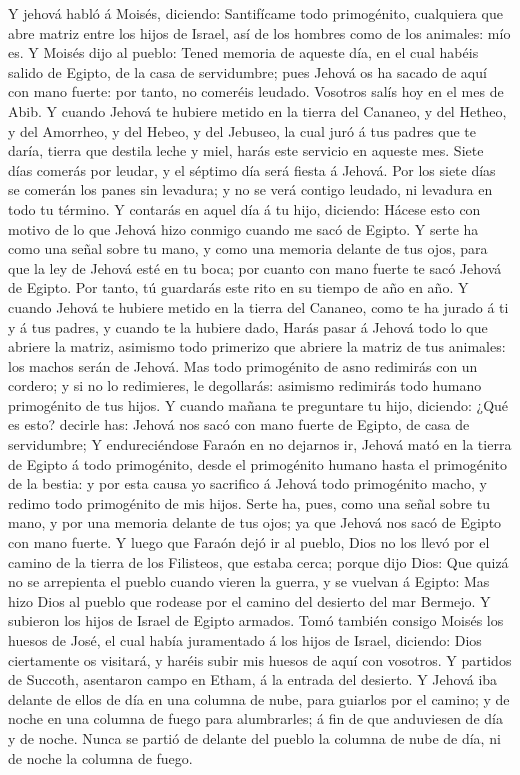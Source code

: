  Y jehová habló á Moisés, diciendo:  Santifícame
todo primogénito, cualquiera que abre matriz entre los hijos de Israel,
así de los hombres como de los animales: mío es.  Y Moisés
dijo al pueblo: Tened memoria de aqueste día, en el cual habéis salido
de Egipto, de la casa de servidumbre; pues Jehová os ha sacado de aquí
con mano fuerte: por tanto, no comeréis leudado.  Vosotros
salís hoy en el mes de Abib.  Y cuando Jehová te hubiere
metido en la tierra del Cananeo, y del Hetheo, y del Amorrheo, y del
Hebeo, y del Jebuseo, la cual juró á tus padres que te daría, tierra que
destila leche y miel, harás este servicio en aqueste mes. 
Siete días comerás por leudar, y el séptimo día será fiesta á Jehová.
 Por los siete días se comerán los panes sin levadura; y no
se verá contigo leudado, ni levadura en todo tu término.  Y
contarás en aquel día á tu hijo, diciendo: Hácese esto con motivo de lo
que Jehová hizo conmigo cuando me sacó de Egipto.  Y serte
ha como una señal sobre tu mano, y como una memoria delante de tus ojos,
para que la ley de Jehová esté en tu boca; por cuanto con mano fuerte te
sacó Jehová de Egipto.  Por tanto, tú guardarás este rito
en su tiempo de año en año.  Y cuando Jehová te hubiere
metido en la tierra del Cananeo, como te ha jurado á ti y á tus padres,
y cuando te la hubiere dado,  Harás pasar á Jehová todo lo
que abriere la matriz, asimismo todo primerizo que abriere la matriz de
tus animales: los machos serán de Jehová.  Mas todo
primogénito de asno redimirás con un cordero; y si no lo redimieres, le
degollarás: asimismo redimirás todo humano primogénito de tus hijos.
 Y cuando mañana te preguntare tu hijo, diciendo: ¿Qué es
esto? decirle has: Jehová nos sacó con mano fuerte de Egipto, de casa de
servidumbre;  Y endureciéndose Faraón en no dejarnos ir,
Jehová mató en la tierra de Egipto á todo primogénito, desde el
primogénito humano hasta el primogénito de la bestia: y por esta causa
yo sacrifico á Jehová todo primogénito macho, y redimo todo primogénito
de mis hijos.  Serte ha, pues, como una señal sobre tu
mano, y por una memoria delante de tus ojos; ya que Jehová nos sacó de
Egipto con mano fuerte.  Y luego que Faraón dejó ir al
pueblo, Dios no los llevó por el camino de la tierra de los Filisteos,
que estaba cerca; porque dijo Dios: Que quizá no se arrepienta el pueblo
cuando vieren la guerra, y se vuelvan á Egipto:  Mas hizo
Dios al pueblo que rodease por el camino del desierto del mar Bermejo. Y
subieron los hijos de Israel de Egipto armados.  Tomó
también consigo Moisés los huesos de José, el cual había juramentado á
los hijos de Israel, diciendo: Dios ciertamente os visitará, y haréis
subir mis huesos de aquí con vosotros.  Y partidos de
Succoth, asentaron campo en Etham, á la entrada del desierto.
 Y Jehová iba delante de ellos de día en una columna de
nube, para guiarlos por el camino; y de noche en una columna de fuego
para alumbrarles; á fin de que anduviesen de día y de noche.
 Nunca se partió de delante del pueblo la columna de nube
de día, ni de noche la columna de fuego.

